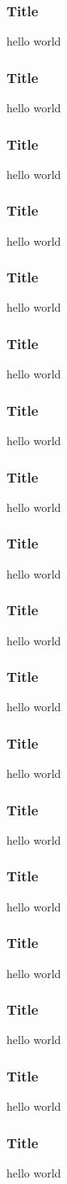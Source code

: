 \documentclass[10pt]{beamer}
\begin{document}
\begin{frame}
\frametitle{Title}
hello world
\end{frame}

\begin{frame}
\frametitle{Title}
hello world
\end{frame}

\begin{frame}
\frametitle{Title}
hello world
\end{frame}

\begin{frame}
\frametitle{Title}
hello world
\end{frame}

\begin{frame}
\frametitle{Title}
hello world
\end{frame}

\begin{frame}
\frametitle{Title}
hello world
\end{frame}

\begin{frame}
\frametitle{Title}
hello world
\end{frame}

\begin{frame}
\frametitle{Title}
hello world
\end{frame}

\begin{frame}
\frametitle{Title}
hello world
\end{frame}

\begin{frame}
\frametitle{Title}
hello world
\end{frame}

\begin{frame}
\frametitle{Title}
hello world
\end{frame}

\begin{frame}
\frametitle{Title}
hello world
\end{frame}

\begin{frame}
\frametitle{Title}
hello world
\end{frame}

\begin{frame}
\frametitle{Title}
hello world
\end{frame}

\begin{frame}
\frametitle{Title}
hello world
\end{frame}

\begin{frame}
\frametitle{Title}
hello world
\end{frame}

\begin{frame}
\frametitle{Title}
hello world
\end{frame}

\begin{frame}
\frametitle{Title}
hello world
\end{frame}

%
%
\end{document}
